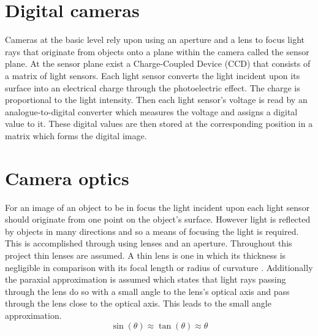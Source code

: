 \section{Digital cameras}
Cameras at the basic level rely upon using an aperture and a lens to focus light rays that originate from objects onto a plane within the camera called the sensor plane. At the sensor plane exist a Charge-Coupled Device (CCD) that consists of a matrix of light sensors. Each light sensor converts the light incident upon its surface into an electrical charge through the photoelectric effect. The charge is proportional to the light intensity. Then each light sensor's voltage is read by an analogue-to-digital converter which measures the voltage and assigns a digital value to it. These digital values are then stored at the corresponding position in a matrix which forms the digital image.





\section{Camera optics}
For an image of an object to be in focus the light incident upon each light sensor should originate from one point on the object's surface. However light is reflected by objects in many directions and so a means of focusing the light is required. This is accomplished through using lenses and an aperture. Throughout this project thin lenses are assumed. A thin lens is one in which its thickness is negligible in comparison with its focal length or radius of curvature \cite{sutton2009image}. Additionally the paraxial approximation is assumed which states that light rays passing through the lens do so with a small angle to the lens's optical axis and pass through the lens close to the optical axis. This leads to the small angle approximation.
\begin{equation}
	\sin(\theta) \approx \tan(\theta) \approx \theta
\end{equation}

